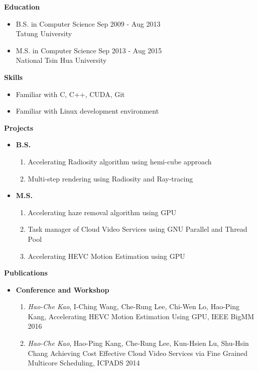 \documentclass[a4paper,12pt]{report}
\begin{document}
{\Large \textbf{Education}}\hrulefill
\begin{itemize}
	\item B.S. in Computer Science \hfill Sep 2009 - Aug 2013\\
	Tatung University
	\item M.S. in Computer Science \hfill Sep 2013 - Aug 2015\\
	National Tsin Hua University
	
\end{itemize}
\vspace{3mm}

{\Large \textbf{Skills}}\hrulefill
\begin{itemize}
	\item Familiar with C, C++, CUDA, Git
	\item Familiar with Linux development environment
\end{itemize}
\vspace{3mm}

{\Large \textbf{Projects}}\hrulefill
\begin{itemize}
	\item \textbf{B.S.} %
	\begin{enumerate}
		\item Accelerating Radiosity algorithm using hemi-cube approach 
		\item Multi-step rendering using Radiosity and Ray-tracing 
	\end{enumerate}
	\item \textbf{M.S.} %
	\begin{enumerate}
		\item Accelerating haze removal algorithm using GPU 
		\item Task manager of Cloud Video Services using GNU Parallel and Thread Pool
		\item Accelerating HEVC Motion Estimation using GPU 
	\end{enumerate}
\end{itemize}
\vspace{3mm}

{\Large \textbf{Publications}}\hrulefill
\begin{itemize}
	\item \textbf{Conference and Workshop}
	\begin{enumerate}
		\item \emph{Hao-Che Kao}, I-Ching Wang, Che-Rung Lee, Chi-Wen Lo, Hao-Ping Kang, Accelerating HEVC Motion Estimation Using GPU, IEEE BigMM 2016
		\item \emph{Hao-Che Kao}, Hao-Ping Kang, Che-Rung Lee, Kun-Hsien Lu, Shu-Hsin Chang Achieving Cost Effective Cloud Video Services via Fine Grained Multicore Scheduling, ICPADS 2014	
	\end{enumerate}
\end{itemize}
\vspace{3mm}
\end{document}
